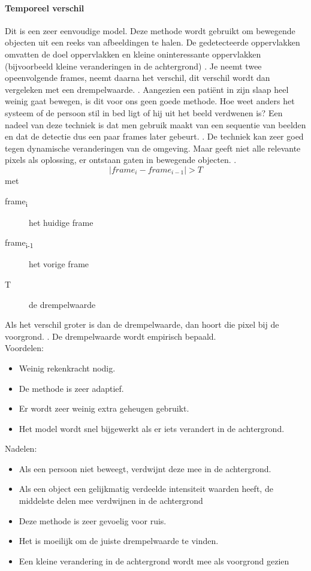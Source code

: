 \paragraph{Temporeel verschil}
\label{refFRD}
Dit is een zeer eenvoudige model. Deze methode wordt gebruikt om bewegende objecten uit een reeks van afbeeldingen te halen. De gedetecteerde oppervlakken omvatten de doel oppervlakken en kleine oninteressante oppervlakken (bijvoorbeeld kleine veranderingen in de achtergrond) \cite{bibTeV}. Je neemt twee opeenvolgende frames, neemt daarna het verschil, dit verschil wordt dan vergeleken met een drempelwaarde. \cite{bibIPC2}. Aangezien een pati\"ent in zijn slaap heel weinig gaat bewegen, is dit voor ons geen goede methode. Hoe weet anders het systeem of de persoon stil in bed ligt of hij uit het beeld verdwenen is? Een nadeel van deze techniek is dat men gebruik maakt van een sequentie van beelden en dat de detectie dus een paar frames later gebeurt. \cite{bibIRC}. De techniek kan zeer goed tegen dynamische veranderingen van de omgeving. Maar geeft niet alle relevante pixels als oplossing, er ontstaan gaten in bewegende objecten. \cite{bibTVD}.
\begin{displaymath}
|frame_{i}-frame_{i-1}|>T
\end{displaymath}
met
\begin{description}
	\item [frame\textsubscript{i}] het huidige frame
	\item [frame\textsubscript{i-1}] het vorige frame
	\item [T] de drempelwaarde
\end{description}
Als het verschil groter is dan de drempelwaarde, dan hoort die pixel bij de voorgrond. \cite{bibBET3}. De drempelwaarde wordt empirisch bepaald.\\
Voordelen:
\begin{itemize}
	\item Weinig rekenkracht nodig.
	\item De methode is zeer adaptief.
	\item Er wordt zeer weinig extra geheugen gebruikt.
	\item Het model wordt snel bijgewerkt als er iets verandert in de achtergrond.
\end{itemize}
Nadelen:
\begin{itemize}
	\item Als een persoon niet beweegt, verdwijnt deze mee in de achtergrond.
	\item Als een object een gelijkmatig verdeelde intensiteit waarden heeft, de middelste delen mee verdwijnen in de achtergrond
	\item Deze methode is zeer gevoelig voor ruis.
	\item Het is moeilijk om de juiste drempelwaarde te vinden.
	\item Een kleine verandering in de achtergrond wordt mee als voorgrond gezien 
\end{itemize}
\cite{bibTeV}

